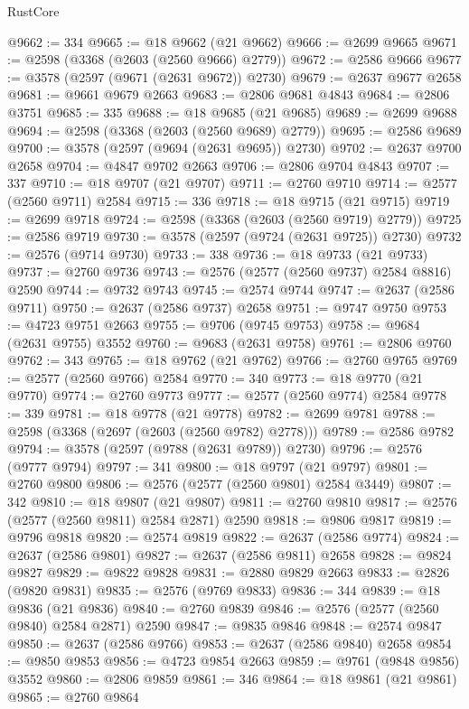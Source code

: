 \begin{lexlean}{RustCore}
\begin{coremodule}
@9662 := 334
@9665 := @18 @9662 (@21 @9662)
@9666 := @2699 @9665
@9671 := @2598 (@3368 (@2603 (@2560 @9666) @2779))
@9672 := @2586 @9666
@9677 := @3578 (@2597 (@9671 (@2631 @9672)) @2730)
@9679 := @2637 @9677 @2658
@9681 := @9661 @9679 @2663
@9683 := @2806 @9681 @4843
@9684 := @2806 @3751
@9685 := 335
@9688 := @18 @9685 (@21 @9685)
@9689 := @2699 @9688
@9694 := @2598 (@3368 (@2603 (@2560 @9689) @2779))
@9695 := @2586 @9689
@9700 := @3578 (@2597 (@9694 (@2631 @9695)) @2730)
@9702 := @2637 @9700 @2658
@9704 := @4847 @9702 @2663
@9706 := @2806 @9704 @4843
@9707 := 337
@9710 := @18 @9707 (@21 @9707)
@9711 := @2760 @9710
@9714 := @2577 (@2560 @9711) @2584
@9715 := 336
@9718 := @18 @9715 (@21 @9715)
@9719 := @2699 @9718
@9724 := @2598 (@3368 (@2603 (@2560 @9719) @2779))
@9725 := @2586 @9719
@9730 := @3578 (@2597 (@9724 (@2631 @9725)) @2730)
@9732 := @2576 (@9714 @9730)
@9733 := 338
@9736 := @18 @9733 (@21 @9733)
@9737 := @2760 @9736
@9743 := @2576 (@2577 (@2560 @9737) @2584 @8816) @2590
@9744 := @9732 @9743
@9745 := @2574 @9744
@9747 := @2637 (@2586 @9711)
@9750 := @2637 (@2586 @9737) @2658
@9751 := @9747 @9750
@9753 := @4723 @9751 @2663
@9755 := @9706 (@9745 @9753)
@9758 := @9684 (@2631 @9755) @3552
@9760 := @9683 (@2631 @9758)
@9761 := @2806 @9760
@9762 := 343
@9765 := @18 @9762 (@21 @9762)
@9766 := @2760 @9765
@9769 := @2577 (@2560 @9766) @2584
@9770 := 340
@9773 := @18 @9770 (@21 @9770)
@9774 := @2760 @9773
@9777 := @2577 (@2560 @9774) @2584
@9778 := 339
@9781 := @18 @9778 (@21 @9778)
@9782 := @2699 @9781
@9788 := @2598 (@3368 (@2697 (@2603 (@2560 @9782) @2778)))
@9789 := @2586 @9782
@9794 := @3578 (@2597 (@9788 (@2631 @9789)) @2730)
@9796 := @2576 (@9777 @9794)
@9797 := 341
@9800 := @18 @9797 (@21 @9797)
@9801 := @2760 @9800
@9806 := @2576 (@2577 (@2560 @9801) @2584 @3449)
@9807 := 342
@9810 := @18 @9807 (@21 @9807)
@9811 := @2760 @9810
@9817 := @2576 (@2577 (@2560 @9811) @2584 @2871) @2590
@9818 := @9806 @9817
@9819 := @9796 @9818
@9820 := @2574 @9819
@9822 := @2637 (@2586 @9774)
@9824 := @2637 (@2586 @9801)
@9827 := @2637 (@2586 @9811) @2658
@9828 := @9824 @9827
@9829 := @9822 @9828
@9831 := @2880 @9829 @2663
@9833 := @2826 (@9820 @9831)
@9835 := @2576 (@9769 @9833)
@9836 := 344
@9839 := @18 @9836 (@21 @9836)
@9840 := @2760 @9839
@9846 := @2576 (@2577 (@2560 @9840) @2584 @2871) @2590
@9847 := @9835 @9846
@9848 := @2574 @9847
@9850 := @2637 (@2586 @9766)
@9853 := @2637 (@2586 @9840) @2658
@9854 := @9850 @9853
@9856 := @4723 @9854 @2663
@9859 := @9761 (@9848 @9856) @3552
@9860 := @2806 @9859
@9861 := 346
@9864 := @18 @9861 (@21 @9861)
@9865 := @2760 @9864

\end{coremodule}
\end{lexlean}
